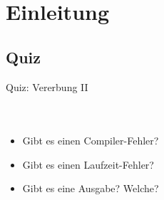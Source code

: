 \documentclass[usepdftitle=false,hyperref={pdfpagelabels=false}]{beamer}
\begin{document}
\title{\titleText}
\subtitle{Polymorphismus, Generics, Libraries}
\author{\tutor}
\date{\today}
\subject{Programmieren}

\frame{\titlepage}



\section{Einleitung}
\subsection{Quiz}
\begin{frame}{Quiz: Vererbung II}
    \begin{minipage}[b]{0.45\linewidth}
        \inputminted[linenos=false, numbersep=5pt, tabsize=4, fontsize=\tiny, label=Animal.java, frame=lines]{java}{Animal.java}
        \vspace{1cm}
        \inputminted[linenos=false, numbersep=5pt, tabsize=4, fontsize=\tiny, label=Jungle.java, frame=lines]{java}{Jungle.java}
    \end{minipage}
    \hspace{0.5cm}
    \begin{minipage}[b]{0.45\linewidth}
        \inputminted[linenos=false, numbersep=5pt, tabsize=4, fontsize=\tiny, label=Cat.java, frame=lines]{java}{Cat.java}
        \begin{itemize}
            \item Gibt es einen Compiler-Fehler?
            \item Gibt es einen Laufzeit-Fehler?
            \item Gibt es eine Ausgabe? Welche?
        \end{itemize}
    \end{minipage}
\end{frame}
\end{document}
